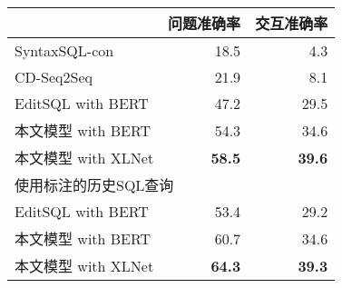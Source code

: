 \begin{tabular}{l|rr}
\hline\hline
                    & 问题准确率 & 交互准确率 \\ \hline
SyntaxSQL-con       & 18.5      & 4.3   \\
CD-Seq2Seq          & 21.9      & 8.1   \\
EditSQL with BERT   & 47.2      & 29.5  \\
本文模型 with BERT   & 54.3      & 34.6  \\
本文模型 with XLNet  & \textbf{58.5} & \textbf{39.6} \\ \hline
\multicolumn{3}{l}{使用标注的历史SQL查询}    \\ \hline
EditSQL with BERT   & 53.4      & 29.2  \\
本文模型 with BERT   & 60.7      & 34.6  \\
本文模型 with XLNet  & \textbf{64.3} & \textbf{39.3}  \\ \hline\hline
\end{tabular}
